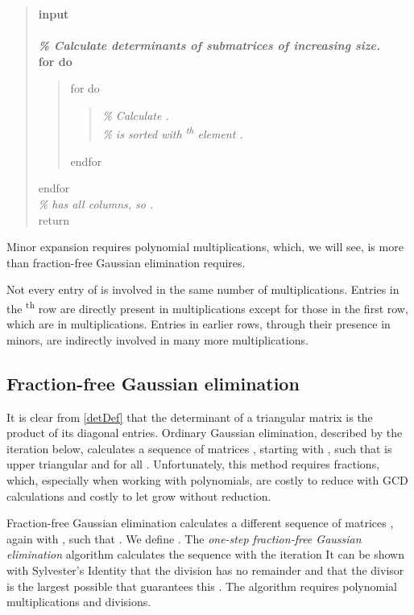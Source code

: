 \documentclass[12pt]{amsart}
\numberwithin{equation}{section}
\numberwithin{figure}{section}
\newcommand{\eq}[2][]{\ifthenelse{\equal{#1}{}}{\eqNoNum{#2}}{\eqNum{\label{#1}
#2}\\}}
\newcommand{\eqNoNum}[1]{}
\newcommand{\eqNum}[2]{}
\newcommand{\xth}{\textsuperscript{th}\xspace}
\begin{document}
\begin{quote} \bf
input  \\
 \\
\textnormal{\it\% Calculate determinants of submatrices of increasing size.} \\
for  do
\begin{quote}
for  do
\begin{quote}
\textnormal{\it\% Calculate .} \\
\textnormal{\it\%  is sorted with \xth element .} \\

\end{quote}
endfor
\end{quote}
endfor \\
\textnormal{\it\%  has all  columns, so .} \\
return 
\end{quote}

Minor expansion requires  polynomial multiplications, which, we will see, is more than fraction-free Gaussian elimination requires.

Not every entry of  is involved in the same number of multiplications. Entries in the \xth row are directly present in  multiplications except for those in the first row, which are in  multiplications. Entries in earlier rows, through their presence in minors, are indirectly involved in many more multiplications.

\subsection{Fraction-free Gaussian elimination}
It is clear from \eqref{detDef} that the determinant of a triangular matrix is the product of its diagonal entries. Ordinary Gaussian elimination, described by the iteration below, calculates a sequence of matrices , starting with , such that  is upper triangular and  for all .
\eq{
a^{(k+1)}_{ij} = a^{(k)}_{ij} - \frac{a^{(k)}_{ik}a^{(k)}_{kj}}{a^{(k)}_{kk}} \quad \forall (i,j) \in \{k+1,\dots,n\} \times \{k,\dots,n\}.
}
Unfortunately, this method requires fractions, which, especially when working with polynomials, are costly to reduce with GCD calculations and costly to let grow without reduction.

Fraction-free Gaussian elimination calculates a different sequence of matrices , again with , such that . We define . The \emph{one-step fraction-free Gaussian elimination} algorithm calculates the sequence  with the iteration
\eq{
a^{[k+1]}_{ij} = \frac{a^{[k]}_{kk}a^{[k]}_{ij} - a^{[k]}_{ik}a^{[k]}_{kj}}{a^{[k-1]}_{k-1,k-1}} \quad \forall (i,j) \in \{k+1,\dots,n\} \times \{k,\dots,n\}.
}
It can be shown with Sylvester's Identity that the division has no remainder and that the divisor is the largest possible that guarantees this \cite{bareiss}. The algorithm requires  polynomial multiplications and divisions.
\end{document}
